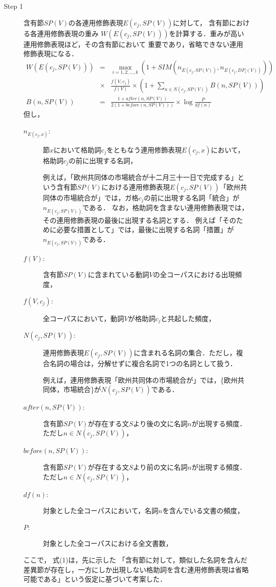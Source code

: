 \begin{description}
  \item[Step 1] 含有節$SP(V)$の各連用修飾表現$E(c_{j},SP(V))$に対して，
含有節における各連用修飾表現の重み
$W(E(c_{j},SP(V)))$を計算する．重みが高い連用修飾表現ほど，その含有節において
重要であり，省略できない連用修飾表現になる．
\begin{eqnarray}
W(E(c_{j},SP(V))) &=& \max_{i=1,2,\dots,k} (1+SIM(n_{E(c_{j},SP(V))},n_{E(c_{j},DP_{i}(V))})) \nonumber \\
               &\times& \frac{f(V,c_{j})}{f(V)} \times (1+\sum_{n \in N(c_{j},SP(V))}B(n,SP(V)))\\
B(n,SP(V)) &=& \frac{1+after(n,SP(V))}{2(1+before(n,SP(V)))} \times \log \frac{P}{df(n)}
\end{eqnarray}
但し，
\begin{description} 
  \item[$n_{E(c_{j},x)}$:] 節$x$において格助詞$c_{j}$をともなう連用修飾表現$E(c_{j},x)$において，格助詞$c_{j}$の前に出現する名詞，

例えば，「欧州共同体の市場統合が十二月三十一日で完成する」という含有節$SP(V)$における連用修飾表現$E(c_{j},SP(V))$「欧州共同体の市場統合が」では，ガ格$c_{j}$の前に出現する名詞「統合」が$n_{E(c_{j},SP(V))}$である．
なお，格助詞を含まない連用修飾表現では，その連用修飾表現の最後に出現する名詞とする．
例えば「そのために必要な措置として」では，最後に出現する名詞「措置」が$n_{E(c_{j},SP(V))}$である．
  \item[$f(V)$:] 含有節$SP(V)$に含まれている動詞$V$の全コーパスにおける出現頻度，
  \item[$f(V,c_{j})$:] 全コーパスにおいて，動詞$V$が格助詞$c_{j}$と共起した頻度，
  \item[$N(c_{j},SP(V))$:] 連用修飾表現$E(c_{j},SP(V))$に含まれる名詞の集合．ただし，複合名詞の場合は，分解せずに複合名詞で1つの名詞として扱う．

例えば，連用修飾表現「欧州共同体の市場統合が」では，\{欧州共同体，市場統合\}が$N(c_{j},SP(V))$である．
  \item[$after(n,SP(V))$:] 含有節$SP(V)$が存在する文$S$より後の文に名詞$n$が出現する頻度．ただし$n \in N(c_{j},SP(V))$，
  \item[$before(n,SP(V))$:] 含有節$SP(V)$が存在する文$S$より前の文に名詞$n$が出現する頻度．ただし$n \in N(c_{j},SP(V))$，
  \item[$df(n)$:] 対象とした全コーパスにおいて，名詞$n$を含んでいる文書の頻度，
  \item[$P$:] 対象とした全コーパスにおける全文書数，
\end{description} 
ここで，
式(1)は，先に示した
「含有節に対して，類似した名詞を含んだ差異節が存在し，一方にしか出現しない格助詞を含む連用修飾表現は省略可能である」という仮定に基づいて考案した．


\end{description}
